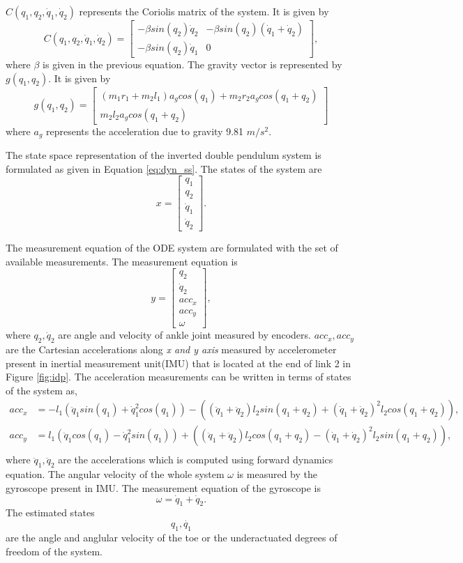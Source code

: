$C(q_1,q_2,\dot{q}_1,\dot{q}_2)$ represents the Coriolis matrix of the system. It is given by 
$$C(q_1,q_2,\dot{q}_1,\dot{q}_2) = 
\begin{bmatrix}
-\beta sin(q_2) \dot{q}_2 &-\beta sin(q_2)(\dot{q}_1 + \dot{q}_2) \\
-\beta sin(q_2) \dot{q}_1 & 0
\end{bmatrix},
$$
where $\beta$ is given in the previous equation. The gravity vector is represented by $g(q_1,q_2)$. It is given by
$$g(q_1,q_2) = 
\begin{bmatrix}
(m_1 r_1 +m_2 l_1)a_g cos(q_1) + m_2 r_2 a_g cos(q_1+q_2) \\
m_2 l_2 a_g cos(q_1+q_2)
\end{bmatrix}
$$
where $a_g$ represents the acceleration due to gravity 9.81 $m/{s}^2$.

The state space representation of the inverted double pendulum system is formulated as given in Equation \ref{eq:dyn_ss}. The states of the system are $$ x = \begin{bmatrix} q_1 \\ q_2 \\ \dot q_1  \\ \dot q_2 \end{bmatrix}. $$

The measurement equation of the ODE system are formulated with the set of available measurements. The measurement equation is  
\begin{equation}
    \label{eq:y_idp}
	y= \begin{bmatrix} q_2 \\ \dot q_2 \\ acc_x \\ acc_y \\ \omega \end{bmatrix},
\end{equation}
where $q_2, \dot{q}_2$ are  angle and velocity of ankle joint measured by encoders. $acc_{x},acc_{y} $ are the Cartesian accelerations along \emph{x and y axis} measured by accelerometer present in inertial measurement unit(IMU) that is located at the end of link 2 in Figure \ref{fig:idp}. The acceleration measurements can be written in terms of states of the system as,
$$ 
    \begin{aligned}
    acc_x &= -l_1 (\ddot q_1 sin(q_1) + \dot q_1^2 cos(q_1)) - ((\ddot q_1 + \ddot q_2) l_2 sin(q_1+q_2) + (\dot q_1 + \dot q_2)^2 l_2 cos(q_1+q_2)), \\
    acc_y &= l_1 (\ddot q_1 cos(q_1) - \dot q_1^2 sin(q_1)) + ((\ddot q_1 + \ddot q_2) l_2 cos(q_1+q_2) - (\dot q_1 + \dot q_2)^2 l_2 sin(q_1+q_2)), \\
    \end{aligned}
$$
where $\ddot q_1 , \ddot q_2 $ are the accelerations which is computed using forward dynamics equation. The angular velocity of the whole system $\omega$ is measured by the gyroscope present in IMU. The measurement equation of the gyroscope is $$ \omega = \dot q_1 + \dot q_2. $$ 
The estimated states $$q_1, \dot{q_1}$$ are the angle and anglular velocity of the toe or the underactuated degrees of freedom of the system.

